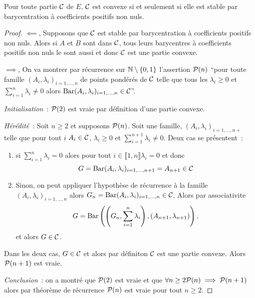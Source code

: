 \begin{prop}
  Pour toute partie $\courbe{}$ de $E$, $\courbe{}$ est convexe si et seulement si elle est stable par barycentration à coefficients positifs non nuls.
\end{prop}
\begin{proof}
  $\impliedby$, Supposons que  $\courbe{}$ est stable par barycentration à coefficients positifs non nuls. Alors si $A$ et $B$ sont dans $\courbe{}$, tous leurs barycentres à coefficients positifs non nuls le sont aussi et donc $\courbe{}$ est une partie convexe.

  $\implies$, On va montrer par récurrence sur $\N\setminus\{0,1\}$ l'assertion $\P(n)$ ``pour toute famille $(A_i,\lambda_i)_{i =1, \ldots, n}$ de points pondérés de $\courbe{}$ telle que tous les $\lambda_i \geq 0$ et $\sum_{i=1}^n \lambda_i\neq 0$ alors $\Bary(A_i,\lambda_i)_{i=1, \ldots, n} \in \courbe{}$''.

  \emph{Initialisation}~: $\P(2)$ est vraie par définition d'une partie convexe.

  \emph{Hérédité}~: Soit $n \geq 2$ et supposons $\P(n)$. Soit une famille, $(A_{i}, \lambda_i)_{i=1, \ldots, n+}$ telle que pour tout $i$ $A_{i} \in \courbe{}$, $\lambda_{i} \geq 0$ et $\sum_{i=1}^{n+1}\lambda_i \neq 0$. Deux cas se présentent~:
  \begin{enumerate}
  \item si $\sum_{i=1}^{n}\lambda_i =0$ alors pour tout $i \in \llbracket 1,n \rrbracket \lambda_i =0$ et donc
    \begin{equation}
      G=\Bary(A_i,\lambda_i)_{i=1, \ldots, n+1}=A_{n+1} \in \courbe{}
    \end{equation}
  \item Sinon, on peut appliquer l'hypothèse de récurrence à la famille $(A_i,\lambda_i)_{i=1, \ldots, n}$ alors $G_n=\Bary(A_i,\lambda_i)_{i=1,\ldots, n} \in \courbe{}$.
    Alors par associativite
    \begin{equation}
      G=\Bary\left(\left(G_n,\sum_{i=1}^n \lambda_i\right), (A_{n+1}, \lambda_{n+1})\right),
    \end{equation}
    et alors $G \in \courbe{}$.
  \end{enumerate}
  Dans les deux cas, $G \in \courbe{}$ et alors par définiton $\courbe{}$ est une partie convexe. Alors $\P(n+1)$ est vraie.

  \emph{Conclusion}~: on a montré que $\P(2)$ est vraie et que $\forall n \geq 2 \P(n) \implies \P(n+1)$ alors par théorème de récurrence $\P(n)$ est vraie pour tout $n \geq 2$.
\end{proof}

